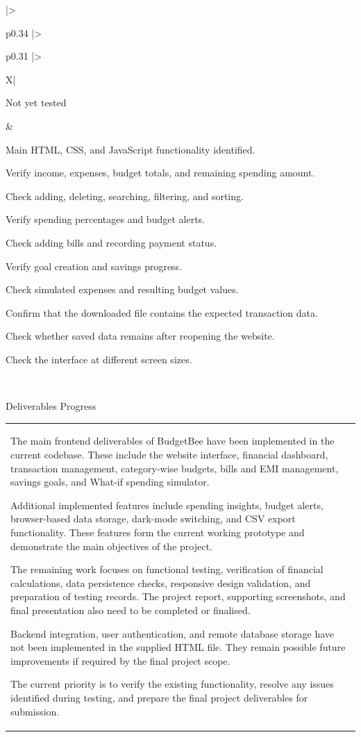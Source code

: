 \documentclass[12pt,a4paper]{article}
\newcommand{\sectiontitle}[1]{%
    {\color{GEUBlue}
    \fontsize{18}{22}\selectfont #1}
}
\newcommand{\answerbox}[2]{%
    \begin{tabularx}{\textwidth}{
        |>{\raggedright\arraybackslash}X|}
        \hline
        \parbox[t][#1][t]{\dimexpr\linewidth-12pt\relax}{
            \vspace{5pt}
            \fontsize{11}{13}\selectfont #2
        }\\
        \hline
    \end{tabularx}
}
\begin{document}
\begin{tabularx}{\textwidth}{
|>{\raggedright\arraybackslash}p{0.34\textwidth}
|>{\raggedright\arraybackslash}p{0.31\textwidth}
|>{\raggedright\arraybackslash}X|
}
{\begin{compresslist}
    \item Not yet tested
\end{compresslist} 
}
&
\parbox[t][11.20cm][t]{\linewidth}{
\begin{compresslist}
    \item Main HTML, CSS, and JavaScript functionality identified.
    \item Verify income, expenses, budget totals, and remaining spending amount.
    \item Check adding, deleting, searching, filtering, and sorting.
    \item Verify spending percentages and budget alerts.
    \item Check adding bills and recording payment status.
    \item Verify goal creation and savings progress.
    \item Check simulated expenses and resulting budget values.
    \item Confirm that the downloaded file contains the expected transaction data.
    \item Check whether saved data remains after reopening the website.
    \item Check the interface at different screen sizes.
\end{compresslist} 
}
\\
\hline

\end{tabularx}

\vspace{1.65cm}

\sectiontitle{Deliverables Progress}

\vspace{0.25cm}

\answerbox{6.50cm}{The main frontend deliverables of BudgetBee have been implemented in the current codebase. These include the website interface, financial dashboard, transaction management, category-wise budgets, bills and EMI management, savings goals, and What-if spending simulator.

Additional implemented features include spending insights, budget alerts, browser-based data storage, dark-mode switching, and CSV export functionality. These features form the current working prototype and demonstrate the main objectives of the project.

The remaining work focuses on functional testing, verification of financial calculations, data persistence checks, responsive design validation, and preparation of testing records. The project report, supporting screenshots, and final presentation also need to be completed or finalised.

Backend integration, user authentication, and remote database storage have not been implemented in the supplied HTML file. They remain possible future improvements if required by the final project scope.

The current priority is to verify the existing functionality, resolve any issues identified during testing, and prepare the final project deliverables for submission.}
\end{document}
